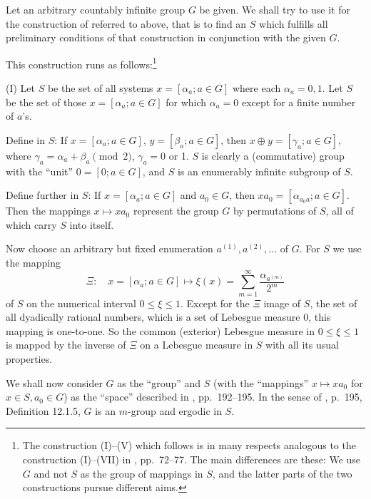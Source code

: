 \documentclass[b5paper,twoside]{article}
\theoremstyle{mvnplain}
\def\mathfrak#1{#1}%
\begin{document}
Let an arbitrary countably infinite group \(\mathfrak G\) be given. We shall
try to use it for the construction of \cite{ref5} referred to above,
that is to find an \(S\) which fulfills all preliminary conditions of that
construction in conjunction with the given \(\mathfrak G\).

This construction runs as follows:\footnote{The construction (I)--(V) which
follows is in many respects analogous to the construction (I)--(VII) in
\cite{ref7}, pp.~72--77. The main differences are these: We use
\(\mathfrak G\) and not \(\mathfrak S\) as the group of mappings in \(S\),
and the latter parts of the two constructions pursue different aims.}

(I) Let \(S\) be the set of all systems \(x=[\alpha_a;a\in\mathfrak G]\)
where each \(\alpha_a=0,1\). Let \(\mathfrak S\) be the set of those
\(x=[\alpha_a;a\in\mathfrak G]\) for which \(\alpha_a=0\) except for a
finite number of \(a\)'s.

Define in \(S\): If \(x=[\alpha_a;a\in\mathfrak G]\),
\(y=[\beta_a;a\in\mathfrak G]\), then
\(x\oplus y=[\gamma_a;a\in\mathfrak G]\), where
\(\gamma_a=\alpha_a+\beta_a\pmod2\), \(\gamma_a=0\) or 1. \(S\) is
clearly a (commutative) group with the ``unit''
\(0=[0;a\in\mathfrak G]\), and \(\mathfrak S\) is an enumerably infinite
subgroup of \(S\).

Define further in \(S\): If \(x=[\alpha_a;a\in\mathfrak G]\) and
\(a_0\in\mathfrak G\), then
\(xa_0=[\alpha_{a_0a};a\in\mathfrak G]\). Then the mappings
\(x\mapsto xa_0\) represent the group \(\mathfrak G\) by permutations of
\(S\), all of which carry \(\mathfrak S\) into itself.

Now choose an arbitrary but fixed enumeration
\(a^{(1)},a^{(2)},\ldots\) of \(\mathfrak G\). For \(S\) we use the mapping
\[
 \Xi:\quad x=[\alpha_a;a\in\mathfrak G]\longmapsto
 \xi(x)=\sum_{m=1}^{\infty}\frac{\alpha_{a^{(m)}}}{2^m}
\]
of \(S\) on the numerical interval \(0\leq\xi\leq1\). Except for the
\(\Xi\) image of \(\mathfrak S\), the set of all dyadically rational numbers,
which is a set of Lebesgue measure 0, this mapping is one-to-one. So the common
(exterior) Lebesgue measure in \(0\leq\xi\leq1\) is mapped by the inverse of
\(\Xi\) on a Lebesgue measure in \(S\) with all its usual properties.

We shall now consider \(\mathfrak G\) as the ``group'' and \(S\) (with the
``mappings'' \(x\mapsto xa_0\) for \(x\in S,a_0\in\mathfrak G\)) as the
``space'' described in \cite{ref5}, pp.~192--195. In the sense of
\cite{ref5}, p.~195, Definition 12.1.5, \(\mathfrak G\) is an
\(m\)-group and ergodic in \(S\).
\end{document}
